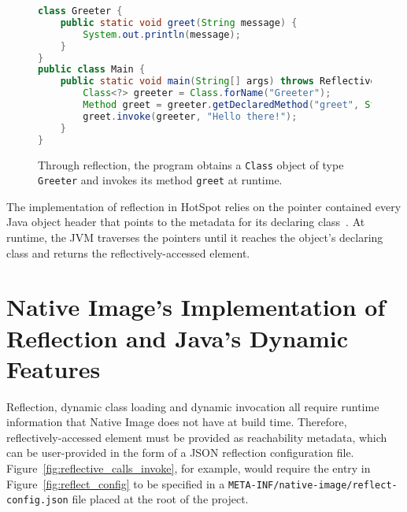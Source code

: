 \begin{figure}[ht]
    \centering
\begin{lstlisting}[language=Java]
class Greeter {
    public static void greet(String message) { 
        System.out.println(message); 
    }
}
public class Main {
    public static void main(String[] args) throws ReflectiveOperationException {
        Class<?> greeter = Class.forName("Greeter");
        Method greet = greeter.getDeclaredMethod("greet", String.class);
        greet.invoke(greeter, "Hello there!");
    }   
}
\end{lstlisting}
    \caption{Through reflection, the program obtains a \texttt{Class} object of type \texttt{Greeter} and invokes its method \texttt{greet} at runtime.}
    \label{fig:reflective_calls}
\end{figure}

The implementation of reflection in HotSpot relies on the pointer contained every Java object header that points to the metadata for its declaring class~\cite{evans_ben_reflection_nodate}. At runtime, the JVM traverses the pointers until it reaches the object's declaring class and returns the reflectively-accessed element.

\section{Native Image's Implementation of Reflection and Java's Dynamic Features}
Reflection, dynamic class loading and dynamic invocation all require runtime information that Native Image does not have at build time. Therefore, reflectively-accessed element must be provided as reachability metadata, which can be user-provided in the form of a JSON reflection configuration file.  
Figure~\ref{fig:reflective_calls_invoke}, for example, would require the entry in Figure~\ref{fig:reflect_config} to be specified in a \verb|META-INF/native-image/reflect-config.json| file placed at the root of the project.

